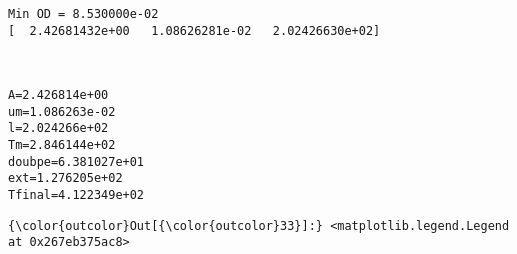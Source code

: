 \documentclass[11pt]{article}
\begin{document}
    \begin{Verbatim}[commandchars=\\\{\}]
Min OD = 8.530000e-02
[  2.42681432e+00   1.08626281e-02   2.02426630e+02]

    \end{Verbatim}

    \begin{center}
    \end{center}
    { \hspace*{\fill} \\}
    
    \begin{Verbatim}[commandchars=\\\{\}]
A=2.426814e+00
um=1.086263e-02
l=2.024266e+02
Tm=2.846144e+02
doubpe=6.381027e+01
ext=1.276205e+02
Tfinal=4.122349e+02

    \end{Verbatim}

            \begin{Verbatim}[commandchars=\\\{\}]
{\color{outcolor}Out[{\color{outcolor}33}]:} <matplotlib.legend.Legend at 0x267eb375ac8>
\end{Verbatim}
        
    \begin{center}
    \end{center}
    { \hspace*{\fill} \\}
    
    \begin{center}
    \end{center}
    { \hspace*{\fill} \\}
    
\end{document}
